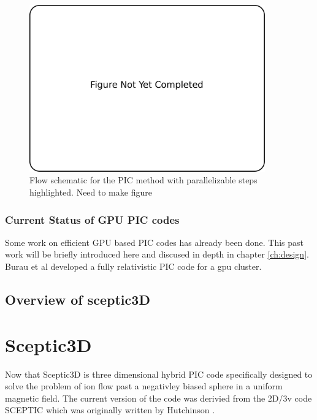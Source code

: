 \begin{figure}
\begin{center}
\includegraphics[width=4in]{introduction/not_finished.pdf}
\end{center}
\caption{Flow schematic for the PIC method with parallelizable steps highlighted. Need to make figure}
\label{fig:pic_flowchart_parallel}
\end{figure}

		\subsection{Current Status of GPU PIC codes}

						Some work on efficient GPU based PIC codes has already been done. This past work will be briefly introduced here and discused in depth in chapter \ref{ch:design}. Burau et al developed a fully relativistic PIC code for a gpu cluster. 
			
	

	
	\section{Overview of sceptic3D}











	\chapter{Sceptic3D}
Now that Sceptic3D is three dimensional hybrid PIC code specifically designed to solve the problem of ion flow past a negativley biased sphere in a uniform magnetic field. The current version of the code was derivied from the 2D/3v code SCEPTIC which was originally written by Hutchinson \cite{Hutchinson2002,Hutchinson2003,Hutchinson2005,Hutchinson2006}.



